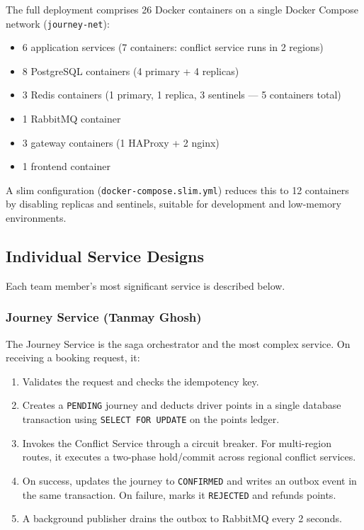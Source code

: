 \documentclass[12pt,a4paper]{article}
\begin{document}
The full deployment comprises 26 Docker containers on a single Docker Compose network (\texttt{journey-net}):
\begin{itemize}[nosep]
  \item 6 application services (7 containers: conflict service runs in 2 regions)
  \item 8 PostgreSQL containers (4 primary + 4 replicas)
  \item 3 Redis containers (1 primary, 1 replica, 3 sentinels --- 5 containers total)
  \item 1 RabbitMQ container
  \item 3 gateway containers (1 HAProxy + 2 nginx)
  \item 1 frontend container
\end{itemize}

A slim configuration (\texttt{docker-compose.slim.yml}) reduces this to 12 containers by disabling replicas and sentinels, suitable for development and low-memory environments.

\subsection{Individual Service Designs}

Each team member's most significant service is described below.

\subsubsection{Journey Service (Tanmay Ghosh)}

The Journey Service is the saga orchestrator and the most complex service. On receiving a booking request, it:
\begin{enumerate}[nosep]
  \item Validates the request and checks the idempotency key.
  \item Creates a \texttt{PENDING} journey and deducts driver points in a single database transaction using \texttt{SELECT FOR UPDATE} on the points ledger.
  \item Invokes the Conflict Service through a circuit breaker. For multi-region routes, it executes a two-phase hold/commit across regional conflict services.
  \item On success, updates the journey to \texttt{CONFIRMED} and writes an outbox event in the same transaction. On failure, marks it \texttt{REJECTED} and refunds points.
  \item A background publisher drains the outbox to RabbitMQ every 2 seconds.
\end{enumerate}
\end{document}

